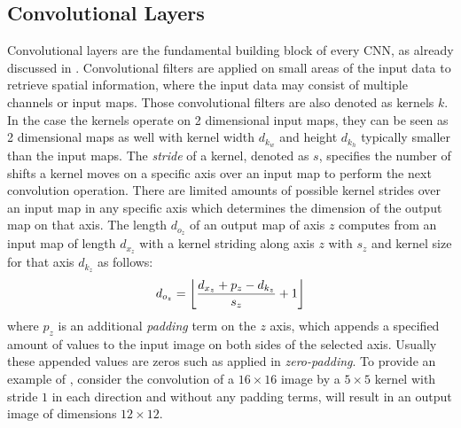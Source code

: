 
\subsection{Convolutional Layers}\label{sec:nn_theory_cnn}
Convolutional layers are the fundamental building block of every CNN, as already discussed in .
Convolutional filters are applied on small areas of the input data to retrieve spatial information, where the input data may consist of multiple channels or input maps.
Those convolutional filters are also denoted as kernels $k$.
In the case the kernels operate on 2 dimensional input maps, they can be seen as 2 dimensional maps as well with kernel width $d_{k_w}$ and height $d_{k_h}$ typically smaller than the input maps.
The \emph{stride} of a kernel, denoted as $s$, specifies the number of shifts a kernel moves on a specific axis over an input map to perform the next convolution operation.
There are limited amounts of possible kernel strides over an input map in any specific axis which determines the dimension of the output map on that axis.
The length $d_{o_z}$ of an output map of axis $z$ computes from an input map of length $d_{x_z}$ with a kernel striding along axis $z$ with $s_z$ and kernel size for that axis $d_{k_z}$ as follows:
\begin{equation}\label{eq:nn_theory_cnn_dim}
  d_{o_z} = \floor*{\frac{d_{x_z} + p_z - d_{k_z}}{s_z} + 1}
\end{equation}
where $p_z$ is an additional \emph{padding} term on the $z$ axis, which appends a specified amount of values to the input image on both sides of the selected axis.
Usually these appended values are zeros such as applied in \emph{zero-padding}.
To provide an example of , consider the convolution of a $16 \times 16$ image by a $5 \times 5$ kernel with stride $1$ in each direction and without any padding terms, will result in an output image of dimensions $12 \times 12$.


